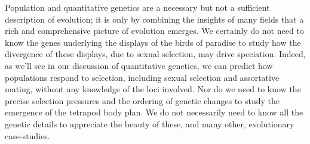 Population and quantitative genetics are a necessary but not a sufficient description of evolution; it is only by combining the insights of many fields that a rich and comprehensive picture of evolution emerges.
We certainly do not need to know the genes underlying the displays of the birds of paradise to study how the divergence of these displays, due to sexual selection, may drive speciation. Indeed, as we'll see in our discussion of quantitative genetics, we can predict how populations respond to selection, including sexual selection and assortative mating, without any knowledge of the loci involved. Nor do we need to know the precise selection pressures and the ordering of genetic changes to study the emergence of the tetrapod body plan. We do not necessarily need to know all the genetic details to appreciate the beauty of these, and many other, evolutionary case-studies. 






